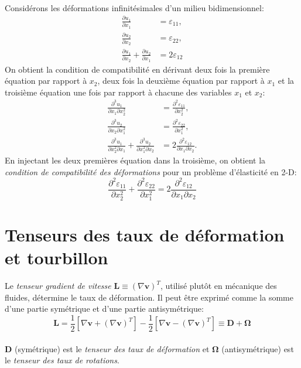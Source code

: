 \paragraph{}
Considérons les déformations infinitésimales d'un milieu bidimensionnel:
$$\begin{aligned}
\frac{\partial u_1}{\partial x_1}&=\varepsilon_{11},\\
\frac{\partial u_2}{\partial x_2}&=\varepsilon_{22},\\
\frac{\partial u_1}{\partial x_2}+\frac{\partial u_2}{\partial x_1}&=2\varepsilon_{12}
\end{aligned}$$
On obtient  la condition de compatibilité en dérivant deux fois la première équation par rapport à $x_2$, deux fois la deuxième équation par rapport à $x_1$ et la troisième équation une fois par rapport à chacune des variables $x_1$ et $x_2$:
$$\begin{aligned}
\frac{\partial^3 u_1}{\partial x_1\partial x_2^2}&=\frac{\partial^2\varepsilon_{11}}{\partial x_2^2},\\
\frac{\partial^3 u_2}{\partial x_2\partial x_1^2}&=\frac{\partial^2\varepsilon_{22}}{\partial x_1^2},\\
\frac{\partial^3 u_1}{\partial x_2^2\partial x_1}+\frac{\partial^3 u_2}{\partial x_1^2\partial x_2}&=2\frac{\partial^2\varepsilon_{12}}{\partial x_1\partial x_2}.
\end{aligned}$$
En injectant les deux premières équation dans la troisième, on obtient la \emph{condition de compatibilité des déformations} pour un problème d'élasticité en 2-D:
$$\frac{\partial^2\varepsilon_{11}}{\partial x_2^2}+\frac{\partial^2\varepsilon_{22}}{\partial x_1^2}=2\frac{\partial^2\varepsilon_{12}}{\partial x_1 \partial x_2}$$
\section{Tenseurs des taux de déformation et tourbillon}
\label{taux_defo_troub}
Le \emph{tenseur gradient de vitesse} $\textbf{L}\equiv (\nabla \textbf{v})^T$, utilisé plutôt en mécanique des fluides, détermine le taux de déformation. Il peut être exprimé comme la somme d'une partie symétrique et d'une partie antisymétrique:
$$\textbf{L}=\frac{1}{2}[\nabla\textbf{v}+(\nabla\textbf{v})^T]-\frac{1}{2}[\nabla\textbf{v}-(\nabla\textbf{v})^T]\equiv \textbf{D}+\mathbf{\Omega}$$
\paragraph{}
\textbf{D} (symétrique) est le \emph{tenseur des taux de déformation} et $\mathbf{\Omega}$ (antisymétrique) est le \emph{tenseur des taux de rotations}.
